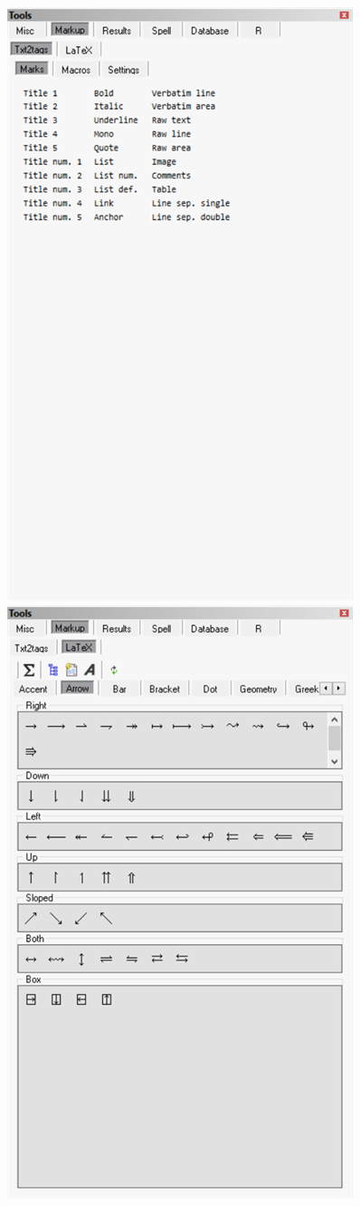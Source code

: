 \begin{figure}[H]
  \includegraphics[scale=0.35]{./res/tools_markup_txt2tags_marks.png}~~
  \includegraphics[scale=0.35]{./res/tools_markup_latex_arrows.png}\\

\end{figure}
